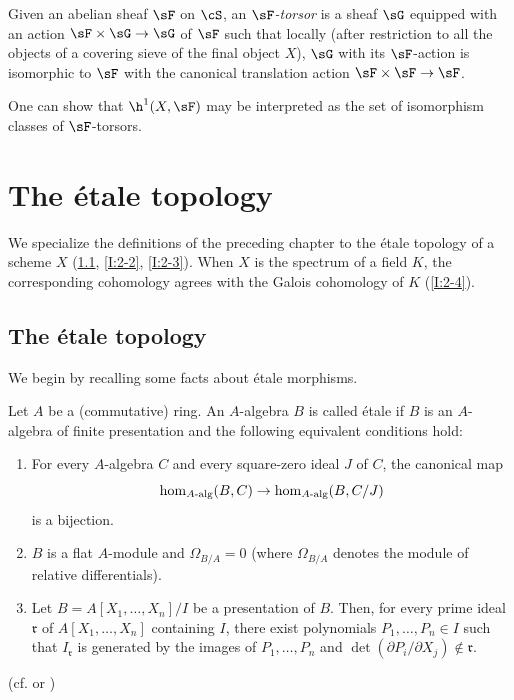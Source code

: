 \subsubsection*{}\label{I:1-6-6}

Given an abelian sheaf $\sF$ on $\cS$, an \emph{$\sF$-torsor} is a
sheaf $\sG$ equipped with an action $\sF\times\sG\to\sG$ of $\sF$
such that locally (after restriction to all the objects of a covering
sieve of the final object $X$), $\sG$ with its $\sF$-action is
isomorphic to $\sF$ with the canonical translation action
$\sF\times\sF\to\sF$.

One can show that $\h^1(X,\sF)$ may be interpreted as the set of
isomorphism classes of $\sF$-torsors.

\section{The étale topology}\label{I:2}

We specialize the definitions of the preceding chapter to the étale
topology of a scheme $X$ (\ref{I:2-1}, \ref{I:2-2}, \ref{I:2-3}). When
$X$ is the spectrum of a field $K$, the corresponding cohomology agrees
with the Galois cohomology of $K$ (\ref{I:2-4}).

\subsection{The étale topology}\label{I:2-1}

We begin by recalling some facts about étale morphisms.

\begin{definition}\label{I:2-1-1}
Let $A$ be a (commutative) ring. An $A$-algebra $B$ is called étale if
$B$ is an $A$-algebra of finite presentation and the following equivalent
conditions hold:
\begin{enumerate}[\indent a)]
  \item For every $A$-algebra $C$ and every square-zero ideal $J$ of $C$,
    the canonical map
    \[
      \hom_{A\textnormal{-alg}}(B,C) \to \hom_{A\textnormal{-alg}}(B,C/J)
    \]
    is a bijection.
  \item $B$ is a flat $A$-module and $\Omega_{B/A}=0$ (where
    $\Omega_{B/A}$ denotes the module of relative differentials).
  \item Let $B=A[X_1,\dotsc,X_n]/I$ be a presentation of $B$. Then, for
    every prime ideal $\mathfrak r$ of $A[X_1,\dotsc,X_n]$ containing $I$, there exist polynomials $P_1,\dotsc,P_n\in I$ such that $I_{\mathfrak r}$ is generated by the images of $P_1,\dotsc,P_n$ and $\det(\partial P_i/\partial X_j)\notin\mathfrak r$.
\end{enumerate}
\end{definition}
(cf. \cite[I]{sga1} or )

